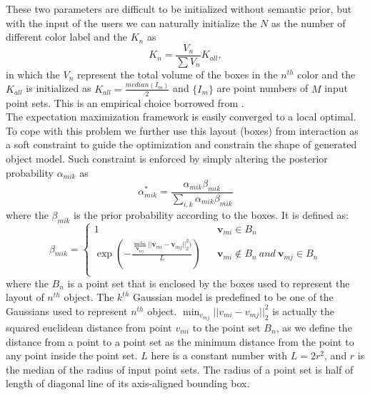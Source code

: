These two parameters are difficult to be initialized without semantic prior, but with the input of the users we can naturally initialize the $N$ as the number of different color label and the ${K_n}$ as 
\begin{equation}
\label{equ:K_n}
K_n=\frac{V_n}{\sum V_n}K_{all},
\end{equation}
in which the $V_n$ represent the total volume of the boxes in the $n^{th}$ color and the $K_{all}$ is initialized as $K_{all}=\frac{median(I_m)}{2}$ and $\{I_m\}$ are point numbers of $M$ input point sets. This is an empirical choice borrowed from \cite{Evangelidis2014}.\\
%
The expectation maximization framework is easily converged to a local optimal. To cope with this problem we further use this layout (boxes) from interaction as a soft constraint to guide the optimization and constrain the shape of generated object model. Such constraint is enforced by simply altering the posterior probability $\alpha_{mik}$ as
%
\begin{equation}
\label{equ:alteralpha}
\alpha_{mik}^*=\frac{\alpha_{mik}\beta_{mik}}{\sum_{i,k}\alpha_{mik}\beta_{mik}}
\end{equation}
where the $\beta_{mik}$ is the prior probability according to the boxes. It is defined as:
\begin{equation}
\beta_{mik}=\left\{
\begin{array}{rcl}
1& &\pmb v_{mi} \in B_n\\
\exp(-\frac{\min_{\pmb v_{mj}}|| \pmb v_{mi} - \pmb v_{mj} ||_2^2  )}{L})& &\pmb v_{mi} \notin B_n~and~\pmb v_{mj} \in B_n\\
\end{array} \right.
\end{equation}
where the $B_n$ is a point set that is enclosed by the boxes used to represent the layout of $n^{th}$ object. The $k^{th}$ Gaussian model is predefined to be one of the Gaussians used to represent $n^{th}$ object. $\min_{v_{mj}}|| v_{mi} - v_{mj} ||_2^2$ is actually the squared euclidean distance from point $v_{mi}$ to the point set $B_n$, as we define the distance from a point to a point set as the minimum distance from the point to any point inside the point set. $L$ here is a constant number with $L=2r^2$, and $r$ is the median of the radius of input point sets. The radius of a point set is half of length of diagonal line of its axis-aligned bounding box.   
